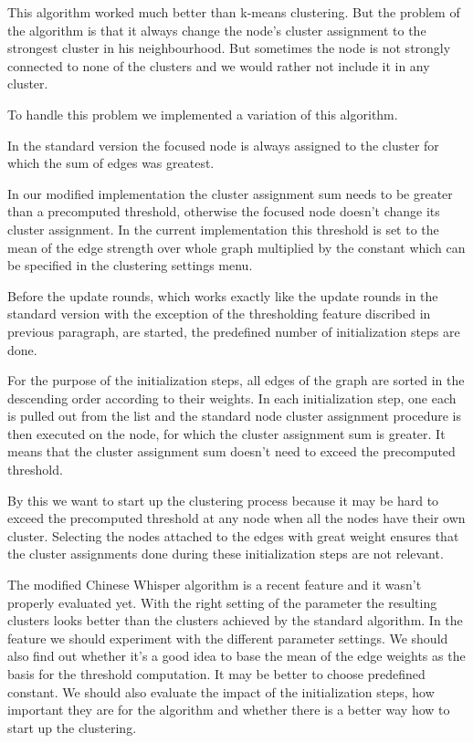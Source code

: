 This algorithm worked much better than k-means clustering. But the problem of the algorithm is that it always change the node's cluster assignment to the strongest cluster in his neighbourhood. But sometimes the node is not strongly connected to none of the clusters and we would rather not include it in any cluster.

To handle this problem we implemented a variation of this algorithm. 

In the standard version the focused node is always assigned to the cluster for which the sum of edges was greatest. 

In our modified implementation the cluster assignment sum needs to be greater than a precomputed threshold, otherwise the focused node doesn't change its cluster assignment. In the current implementation this threshold is set to the mean of the edge strength over whole graph multiplied by the constant which can be specified in the clustering settings menu.

Before the update rounds, which works exactly like the update rounds in the standard version with the exception of the thresholding feature discribed in previous paragraph, are started, the predefined number of initialization steps are done.

For the purpose of the initialization steps, all edges of the graph are sorted in the descending order according to their weights. In each initialization step, one each is pulled out from the list and the standard node cluster assignment procedure is then executed on the node, for which the cluster assignment sum is greater. It means that the cluster assignment sum doesn't need to exceed the precomputed threshold.

By this we want to start up the clustering process because it may be hard to exceed the precomputed threshold at any node when all the nodes have their own cluster. Selecting the nodes attached to the edges with great weight ensures that the cluster assignments done during these initialization steps are not relevant.

The modified Chinese Whisper algorithm is a recent feature and it wasn't properly evaluated yet. With the right setting of the parameter the resulting clusters looks better than the clusters achieved by the standard algorithm. In the feature we should experiment with the different parameter settings. We should also find out whether it's a good idea to base the mean of the edge weights as the basis for the threshold computation. It may be better to choose predefined constant. We should also evaluate the impact of the initialization steps, how important they are for the algorithm and whether there is a better way how to start up the clustering.

